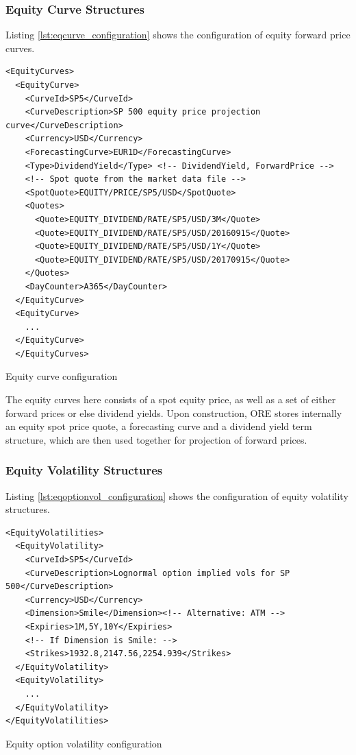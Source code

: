 \documentclass[12pt, a4paper]{article}
\newenvironment{longlisting}{\captionsetup{type=listing}}{}
\begin{document}

\subsubsection{Equity Curve Structures}

Listing \ref{lst:eqcurve_configuration} shows the configuration of equity forward price curves.

\begin{longlisting}
\begin{verbatim}
<EquityCurves>
  <EquityCurve>
    <CurveId>SP5</CurveId>
    <CurveDescription>SP 500 equity price projection curve</CurveDescription>
    <Currency>USD</Currency>
    <ForecastingCurve>EUR1D</ForecastingCurve>
    <Type>DividendYield</Type> <!-- DividendYield, ForwardPrice -->
    <!-- Spot quote from the market data file -->
    <SpotQuote>EQUITY/PRICE/SP5/USD</SpotQuote> 
    <Quotes>
      <Quote>EQUITY_DIVIDEND/RATE/SP5/USD/3M</Quote>
      <Quote>EQUITY_DIVIDEND/RATE/SP5/USD/20160915</Quote>
      <Quote>EQUITY_DIVIDEND/RATE/SP5/USD/1Y</Quote>
      <Quote>EQUITY_DIVIDEND/RATE/SP5/USD/20170915</Quote>
    </Quotes>
    <DayCounter>A365</DayCounter>
  </EquityCurve>
  <EquityCurve>
    ...
  </EquityCurve> 
  </EquityCurves>
\end{verbatim}
\caption{Equity curve configuration}
\label{lst:eqcurve_configuration}
\end{longlisting}

The equity curves here consists of a spot equity price, as well as a set of either forward prices or else dividend 
yields. Upon construction, ORE stores internally an equity spot price quote, a forecasting curve and a dividend yield 
term structure, which are then used together for projection of forward prices.

\subsubsection{Equity Volatility Structures}

Listing \ref{lst:eqoptionvol_configuration} shows the configuration of equity volatility structures.

\begin{longlisting}
\begin{verbatim}
<EquityVolatilities>
  <EquityVolatility>
    <CurveId>SP5</CurveId>
    <CurveDescription>Lognormal option implied vols for SP 500</CurveDescription>
    <Currency>USD</Currency>
    <Dimension>Smile</Dimension><!-- Alternative: ATM -->
    <Expiries>1M,5Y,10Y</Expiries>
    <!-- If Dimension is Smile: -->
    <Strikes>1932.8,2147.56,2254.939</Strikes>
  </EquityVolatility>
  <EquityVolatility>
    ...
  </EquityVolatility>
</EquityVolatilities>
\end{verbatim}
\caption{Equity option volatility configuration}
\label{lst:eqoptionvol_configuration}
\end{longlisting}
\end{document}
